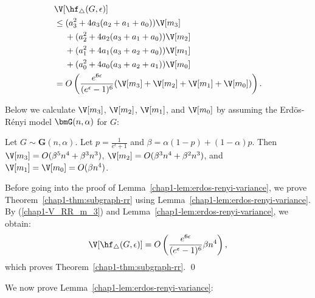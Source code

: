 \begin{align}
    &\V[\hf_{\triangle}(G, \epsilon)] \nonumber\\
    &\leq (a_3^2 + 4a_3(a_2 + a_1 + a_0)) \V[m_3] \nonumber\\
    & \hspace{4.5mm} + (a_2^2 + 4a_2(a_3 + a_1 + a_0)) \V[m_2] \nonumber\\
    & \hspace{4.5mm} + (a_1^2 + 4a_1(a_3 + a_2 + a_0)) \V[m_1] \nonumber\\
    & \hspace{4.5mm} + (a_0^2 + 4a_0(a_3 + a_2 + a_1)) \V[m_0] \nonumber\\
    &= O\left( \frac{e^{6\epsilon}}{(e^\epsilon-1)^6} (\V[m_3] + \V[m_2] + \V[m_1] + \V[m_0]) \right).
    \label{chap1-V_RR_m_3}
\end{align}

Below we calculate $\V[m_3]$, $\V[m_2]$, $\V[m_1]$, and $\V[m_0]$ by assuming the Erd\"{o}s-R\'{e}nyi model $\bmG(n, \alpha)$ for $G$:

\begin{lemma}\label{chap1-lem:erdos-renyi-variance}
  Let $G \sim \textbf{G}(n,\alpha)$. 
  Let $p = \frac{1}{e^\epsilon+1}$ and 
  $\beta = \alpha(1-p) + (1-\alpha)p$. 
  Then $\V[m_3] = O(\beta^5 n^4 + \beta^3
  n^3)$, $\V[m_2] = O(\beta^3 n^4 + \beta^2 n^3)$, and 
  $\V[m_1] = \V[m_0] = O(\beta n^4)$.
\end{lemma}
Before going into the proof of Lemma~\ref{chap1-lem:erdos-renyi-variance}, we prove Theorem~\ref{chap1-thm:subgraph-rr} using Lemma~\ref{chap1-lem:erdos-renyi-variance}. 
By (\ref{chap1-V_RR_m_3}) and Lemma~\ref{chap1-lem:erdos-renyi-variance}, we obtain: 
\begin{align*}
\V[\hf_{\triangle}(G, \epsilon)] = O\left( \frac{e^{6\epsilon}}{(e^\epsilon-1)^6} \beta n^4 \right),
\end{align*}
which proves Theorem~\ref{chap1-thm:subgraph-rr}. \qed

We now prove Lemma~\ref{chap1-lem:erdos-renyi-variance}:

